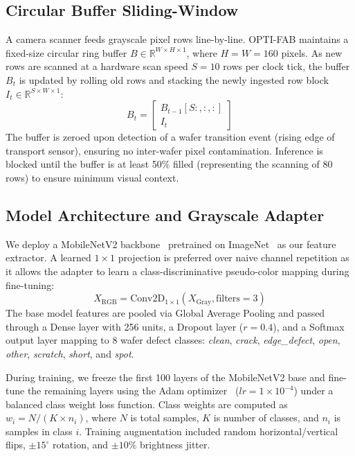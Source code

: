 \documentclass[conference]{IEEEtran}
\begin{document}
\subsection{Circular Buffer Sliding-Window}
A camera scanner feeds grayscale pixel rows line-by-line. OPTI-FAB maintains a fixed-size circular ring buffer $B \in \mathbb{R}^{W \times H \times 1}$, where $H = W = 160$ pixels. As new rows are scanned at a hardware scan speed $S = 10$ rows per clock tick, the buffer $B_t$ is updated by rolling old rows and stacking the newly ingested row block $I_t \in \mathbb{R}^{S \times W \times 1}$:
\begin{equation}
B_t = \begin{bmatrix} B_{t-1}[S:, :, :] \\ I_t \end{bmatrix}
\end{equation}
The buffer is zeroed upon detection of a wafer transition event (rising edge of transport sensor), ensuring no inter-wafer pixel contamination. Inference is blocked until the buffer is at least 50\% filled (representing the scanning of 80 rows) to ensure minimum visual context.

\subsection{Model Architecture and Grayscale Adapter}
We deploy a MobileNetV2 backbone~\cite{sandler2018mobilenetv2} pretrained on ImageNet~\cite{deng2009imagenet} as our feature extractor. A learned $1 \times 1$ projection is preferred over naive channel repetition as it allows the adapter to learn a class-discriminative pseudo-color mapping during fine-tuning:
\begin{equation}
X_{\text{RGB}} = \text{Conv2D}_{1 \times 1}(X_{\text{Gray}}, \text{filters}=3)
\end{equation}
The base model features are pooled via Global Average Pooling and passed through a Dense layer with 256 units, a Dropout layer ($r = 0.4$), and a Softmax output layer mapping to 8 wafer defect classes: \textit{clean}, \textit{crack}, \textit{edge\_defect}, \textit{open}, \textit{other}, \textit{scratch}, \textit{short}, and \textit{spot}.

During training, we freeze the first 100 layers of the MobileNetV2 base and fine-tune the remaining layers using the Adam optimizer~\cite{kingma2014adam} ($lr = 1\times 10^{-4}$) under a balanced class weight loss function. Class weights are computed as $w_i = N / (K \times n_i)$, where $N$ is total samples, $K$ is number of classes, and $n_i$ is samples in class $i$. Training augmentation included random horizontal/vertical flips, $\pm 15^\circ$ rotation, and $\pm 10\%$ brightness jitter.
\end{document}
